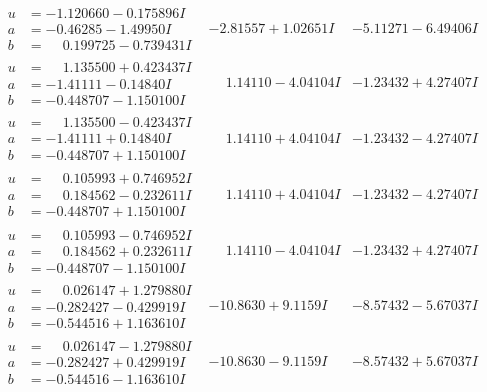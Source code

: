 \documentclass[1p]{elsarticle_modified}
\theoremstyle{definition}
\begin{document}
$$\begin{array}{c|c|c}
\begin{aligned}
u &= -1.120660 - 0.175896 I \\
a &= -0.46285 - 1.49950 I \\
b &= \phantom{-}0.199725 - 0.739431 I\end{aligned}
 & -2.81557 + 1.02651 I & -5.11271 - 6.49406 I \\ \hline\begin{aligned}
u &= \phantom{-}1.135500 + 0.423437 I \\
a &= -1.41111 - 0.14840 I \\
b &= -0.448707 - 1.150100 I\end{aligned}
 & \phantom{-}1.14110 - 4.04104 I & -1.23432 + 4.27407 I \\ \hline\begin{aligned}
u &= \phantom{-}1.135500 - 0.423437 I \\
a &= -1.41111 + 0.14840 I \\
b &= -0.448707 + 1.150100 I\end{aligned}
 & \phantom{-}1.14110 + 4.04104 I & -1.23432 - 4.27407 I \\ \hline\begin{aligned}
u &= \phantom{-}0.105993 + 0.746952 I \\
a &= \phantom{-}0.184562 - 0.232611 I \\
b &= -0.448707 + 1.150100 I\end{aligned}
 & \phantom{-}1.14110 + 4.04104 I & -1.23432 - 4.27407 I \\ \hline\begin{aligned}
u &= \phantom{-}0.105993 - 0.746952 I \\
a &= \phantom{-}0.184562 + 0.232611 I \\
b &= -0.448707 - 1.150100 I\end{aligned}
 & \phantom{-}1.14110 - 4.04104 I & -1.23432 + 4.27407 I \\ \hline\begin{aligned}
u &= \phantom{-}0.026147 + 1.279880 I \\
a &= -0.282427 - 0.429919 I \\
b &= -0.544516 + 1.163610 I\end{aligned}
 & -10.8630 + 9.1159 I & -8.57432 - 5.67037 I \\ \hline\begin{aligned}
u &= \phantom{-}0.026147 - 1.279880 I \\
a &= -0.282427 + 0.429919 I \\
b &= -0.544516 - 1.163610 I\end{aligned}
 & -10.8630 - 9.1159 I & -8.57432 + 5.67037 I \\ \hline\begin{aligned}

\end{aligned}
\end{array}$$
\end{document}
